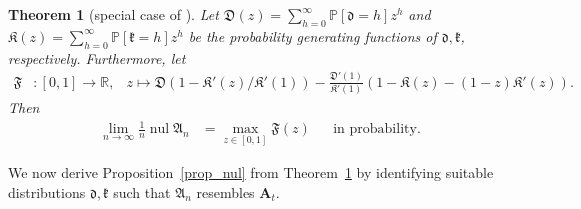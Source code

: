 \documentclass[10pt,reqno]{amsart}
\numberwithin{equation}{section}
\renewcommand{\vec}[1]{\boldsymbol{#1}}
\newcommand\fA{\mathfrak A}
\newcommand\fD{\mathfrak D}
\newcommand\fF{\mathfrak F}
\newcommand\fK{\mathfrak K}
\newcommand\fd{\mathfrak d}
\newcommand\fk{\mathfrak k}
\newcommand\vA{\vec A}
\newcommand\brk[1]{\left\lbrack{#1}\right\rbrack}
\newcommand\RR{\mathbb{R}}
\newcommand\pr{\mathbb{P}}
\newcommand\Prop{Proposition}
\newcommand\Thm{Theorem}
\newtheorem{theorem}[definition]{Theorem}
\DeclareMathOperator{\nul}{nul}
\def\pr{{\mathbb P}}
\begin{document}
\begin{theorem}[{special case of \cite[\Thm~1.1]{Maurice}}]\label{thm_maurice}
	Let $\fD(z)=\sum_{h=0}^\infty\pr\brk{\fd=h}z^h$ and $\fK(z)=\sum_{h=0}^\infty\pr\brk{\fk=h}z^h$ be the probability generating functions of $\fd,\fk$, respectively.
	Furthermore, let 
	\begin{align}\label{eq_thm_maurice}
		\fF&:[0,1]\to\RR,&z\mapsto\fD(1-\fK'(z)/\fK'(1))-\frac{\fD'(1)}{\fK'(1)}(1-\fK(z)-(1-z)\fK'(z)).
	\end{align}
	Then 
		\begin{align*}
			\lim_{n\to\infty}\frac1n\nul\fA_n&=\max_{z\in[0,1]}\fF(z)&&\mbox{in probability.}
		\end{align*}
\end{theorem}

We now derive \Prop~\ref{prop_nul} from \Thm~\ref{thm_maurice} by identifying suitable distributions $\fd,\fk$ such that $\fA_n$ resembles $\vA_t$.
\end{document}
